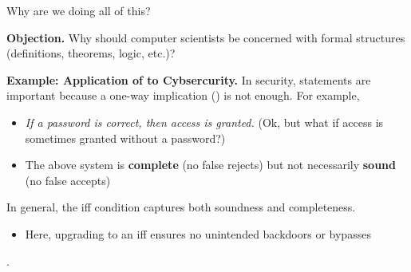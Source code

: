 \documentclass[10pt]{beamer}
\begin{document}
\begin{frame}{Why are we doing all of this?}


\colorbox{red!30}{\textbf{Objection.}} Why should computer scientists be concerned with formal structures (definitions, theorems, logic, etc.)?

\pause 
\vfill \vfill 
\colorbox{green!30}{\textbf{Example: Application of  to Cybsercurity.}} In security,  statements are important because a one-way implication () is not enough.
\pause 
For example,
\begin{itemize}
	\item \textit{If a password is correct, then access is granted.} (Ok, but what if access is sometimes granted without a password?) \pause 
	\item The above system is \textbf{complete} (no false rejects) but not necessarily \textbf{sound} (no false accepts)
\end{itemize}

\pause 
In general, the iff condition captures both soundness and completeness.

\begin{itemize}
	\item Here, upgrading to an iff ensures no unintended backdoors or bypasses
\end{itemize}
.
\end{frame}
\end{document}

